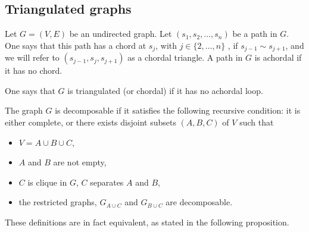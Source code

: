 \subsection{Triangulated graphs}
\begin{definition}
\label{def:triangul}
Let $G = (V,E)$ be an undirected graph. Let  
$(s_1, s_2, \ldots, s_n)$ be a path in $G$. One says that this path
has a chord at $s_j$,   with $j\in
\{2, \ldots, n\}$ , if $s_{j-1} \sim s_{j+1}$, and we will refer to $(s_{j-1}, s_j, s_{j+1})$ as a chordal triangle. A path in $G$ is
achordal if it has no chord.

One says that  $G$ is triangulated (or chordal) if it has no achordal
loop.
\end{definition}
\begin{definition}
\label{def:decomposable}
The graph $G$ is decomposable if it satisfies the following recursive
condition: it is either complete, or there exists disjoint
subsets $(A,B,C)$ of $V$ such that
\begin{itemize}
\item $V = A \cup B \cup C$,  
\item $A$ and $B$ are not empty,
\item $C$ is clique in $G$, $C$ separates $A$ and $B$, 
\item the restricted
graphs, $G_{A\cup C}$ and $G_{B\cup C}$ are decomposable.
\end{itemize}
\end{definition}
These definitions are in fact equivalent, as stated in the
following proposition.

